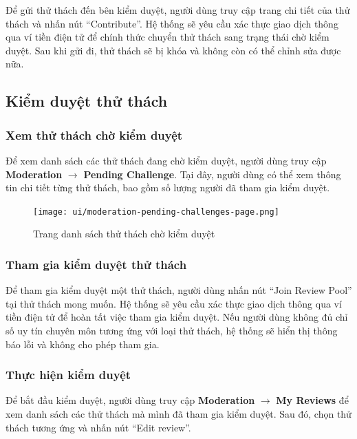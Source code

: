 Để gửi thử thách đến bên kiểm duyệt, người dùng truy cập trang chi tiết của thử thách và nhấn nút ``Contribute''.  
Hệ thống sẽ yêu cầu xác thực giao dịch thông qua ví tiền điện tử để chính thức chuyển thử thách sang trạng thái chờ kiểm duyệt.  
Sau khi gửi đi, thử thách sẽ bị khóa và không còn có thể chỉnh sửa được nữa.

\subsection{Kiểm duyệt thử thách}

\subsubsection{Xem thử thách chờ kiểm duyệt}

Để xem danh sách các thử thách đang chờ kiểm duyệt, người dùng truy cập \textbf{Moderation} $\rightarrow$ \textbf{Pending Challenge}.  
Tại đây, người dùng có thể xem thông tin chi tiết từng thử thách, bao gồm số lượng người đã tham gia kiểm duyệt.

\begin{figure}[H]
  \centering
  \texttt{[image: ui/moderation-pending-challenges-page.png]}
  \caption{Trang danh sách thử thách chờ kiểm duyệt}
  \label{fig:moderation-pending-challenges-page}
\end{figure}

\subsubsection{Tham gia kiểm duyệt thử thách}

Để tham gia kiểm duyệt một thử thách, người dùng nhấn nút ``Join Review Pool'' tại thử thách mong muốn.  
Hệ thống sẽ yêu cầu xác thực giao dịch thông qua ví tiền điện tử để hoàn tất việc tham gia kiểm duyệt.
Nếu người dùng không đủ chỉ số uy tín chuyên môn tương ứng với loại thử thách, hệ thống sẽ hiển thị thông báo lỗi và không cho phép tham gia.

\subsubsection{Thực hiện kiểm duyệt}

Để bắt đầu kiểm duyệt, người dùng truy cập \textbf{Moderation} $\rightarrow$ \textbf{My Reviews} để xem danh sách các thử thách mà mình đã tham gia kiểm duyệt.  
Sau đó, chọn thử thách tương ứng và nhấn nút ``Edit review''.

